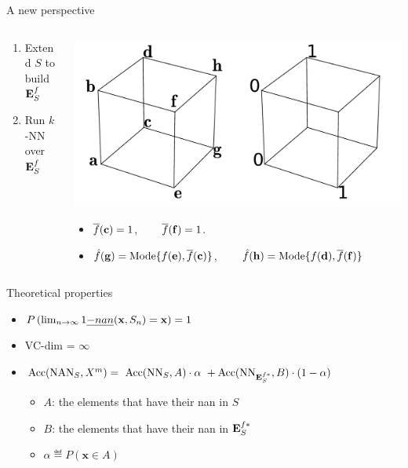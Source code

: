\documentclass{beamer}
\begin{document}
\begin{frame}{A new perspective}
  \begin{columns}
    \begin{column}{.5\textwidth}
      \begin{enumerate}
        \item Extend $S$ to build $\mathbf{E}_{S}^{f}$
        \item Run $k$-NN over $\mathbf{E}_{S}^{f}$
      \end{enumerate}
    \end{column}
    \begin{column}{.5\textwidth}
      \begin{center}
        \includegraphics[width=.8\textwidth]{figures/ae_example.pdf}
      \end{center}
      \begin{itemize}
      \item $\overline{f}(\mathbf{c}) = 1$, ~~~
        $\overline{f}(\mathbf{f}) = 1$.
      \item $\hat{f}(\mathbf{g}) = \text{Mode}\{f(\mathbf{e}),
        \overline{f}(\mathbf{c})\}$, ~~~
            $\hat{f}(\mathbf{h}) = \text{Mode}\{f(\mathbf{d}),
            \overline{f}(\mathbf{f})\}$
      \end{itemize}
    \end{column}
  \end{columns}
\end{frame}

\begin{frame}{Theoretical properties}
  \begin{itemize}
    \item $P\left(\lim_{n \to \infty} 1\emph{-nan}(\mathbf{x}, S_n) =
      \mathbf{x}\right) = 1$
    \item VC-dim = $\infty$
    \item $\mbox{Acc}(\mbox{NAN}_S, X^m) = ~\mbox{Acc}(\text{NN}_S, A) \cdot \alpha ~ +
      \mbox{Acc}(\text{NN}_{\mathbf{E}_{S}^{f*}}, B) \cdot (1 - \alpha) $
    \begin{itemize}
    \item $A$: the elements that have their nan in $S$
    \item $B$: the elements that have their nan in $\mathbf{E}_{S}^{f*}$
    \item $\alpha \eqdef P(\mathbf{x} \in A)$
  \end{itemize}
  \end{itemize}
\end{frame}
\end{document}
